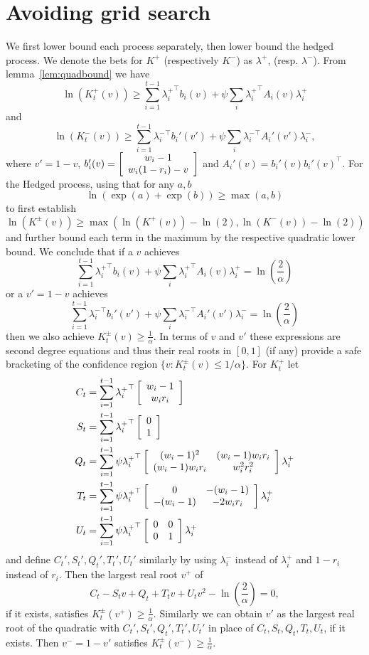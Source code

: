 \section{Avoiding grid search}
\label{app:nogrid2d}
We first lower bound each process separately, then lower bound
the hedged process. We denote the bets for $K^{+}$ (respectively
$K^{-}$) as $\lambda^{+}$, (resp. $\lambda^{-}$).
From lemma~\ref{lem:quadbound} we have
\[
\ln(K_t^{+}(v)) \geq \sum_{i=1}^{t-1} {\lambda_i^{+}}^\top b_i(v) + \psi \sum_i {\lambda_i^{+}}^\top A_i(v) {\lambda_i^{+}}
\]
and
\[
\ln(K_t^{-}(v)) \geq \sum_{i=1}^{t-1} {\lambda_i^{-}}^\top b_i'(v') + \psi \sum_i {\lambda_i^{-}}^\top A_i'(v') {\lambda_i^{-}},
\]
where $v'=1-v$, 
$b_i'(v)=
\left[\begin{array}{c} w_i-1 \\ w_i (1-r_i) -v \end{array}\right]
$
and $A_i'(v)=b_i'(v)b_i'(v)^\top$.
For the Hedged process, using that for any $a,b$
\[
\ln\left(\exp(a)+\exp(b)\right)\geq \max(a,b)
\]
to first establish
\[
\ln(K^{\pm}(v)) \geq \max(\ln(K^{+}(v))-\ln(2),\ln(K^{-}(v))-\ln(2))
\]
and further bound each term in the maximum by the respective 
quadratic lower bound. We conclude that
if a $v$ achieves 
\[
 \sum_{i=1}^{t-1} {\lambda_i^{+}}^\top b_i(v) + \psi \sum_i {\lambda_i^{+}}^\top A_i(v) \lambda_i^{+} = \ln\left(\frac{2}{\alpha}\right)
\]
or a $v'=1-v$ achieves 
\[
\sum_{i=1}^{t-1} {\lambda_i^{-}}^\top b_i'(v') + \psi \sum_i {\lambda_i^{-}}^\top A_i'(v') \lambda_i^{-} = \ln\left(\frac{2}{\alpha}\right)
\]
then we also achieve $K_t^{\pm}(v) \geq \frac{1}{\alpha}$.
In terms of $v$ and $v'$ these expressions are second degree
equations and thus their real roots in $[0,1]$ (if any) provide 
a safe bracketing of the confidence region $\{v:K_t^{\pm}(v)\leq 1/\alpha\}$. For $K_t^{+}$ let
\begin{align}
C_t&= \sum_{i=1}^{t-1} {\lambda_i^{+}}^\top \left[\begin{array}{c} w_i-1 \\ w_i r_i \end{array}\right] \label{eq:upsuffc}\\
S_t&= \sum_{i=1}^{t-1} {\lambda_i^{+}}^\top \left[\begin{array}{c} 0 \\ 1 \end{array}\right] \\
Q_t&= \sum_{i=1}^{t-1} \psi  {\lambda_i^{+}}^\top \left[\begin{array}{cc} (w_i-1)^2 & (w_i-1)w_i r_i \\ (w_i-1)w_i r_i & w_i^2r_i^2 \end{array}\right] \lambda_i^{+} \\
T_t&= \sum_{i=1}^{t-1} \psi  {\lambda_i^{+}}^\top \left[\begin{array}{cc} 0 & -(w_i-1) \\ -(w_i-1) & -2w_ir_i \end{array}\right] \lambda_i^{+} \\
U_t&=  \sum_{i=1}^{t-1} \psi {\lambda_i^{+}}^\top \left[\begin{array}{cc} 0 & 0 \\ 0 & 1 \end{array}\right] \lambda_i^{+} \label{eq:upsuffu}
\end{align}
and define $C_t',S_t',Q_t',T_t',U_t'$ similarly by using $\lambda_i^{-}$ 
instead of $\lambda_i^{+}$ and $1-r_i$ instead of $r_i$. Then
the largest real root $v^{+}$ of
\[
C_t - S_t v + Q_t + T_t v + U_t v^2 - \ln\left(\frac{2}{\alpha}\right) = 0,
\]
if it exists, satisfies $K_t^{\pm}(v^{+})\geq \frac{1}{\alpha}$. Similarly
we can obtain $v'$ as the largest real root of the quadratic
with $C_t',S_t',Q_t',T_t',U_t'$ in place of $C_t,S_t,Q_t,T_t,U_t$,
if it exists. Then $v^{-}=1-v'$ satisfies $K_t^{\pm}(v^{-})\geq \frac{1}{\alpha}$.


